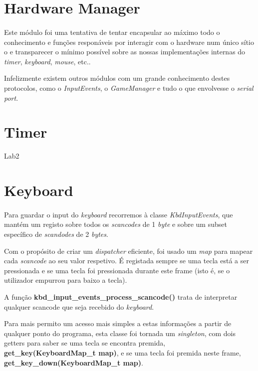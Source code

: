 \documentclass{report}
\begin{document}
\section{Hardware Manager}

\paragraph{}
Este módulo foi uma tentativa de tentar encapsular ao máximo todo o conhecimento e funções responáveis por interagir com o hardware num único sítio o e transparecer o mínimo possível sobre as nossas implementações internas do \textit{timer}, \textit{keyboard}, \textit{mouse}, etc..

Infelizmente existem outros módulos com um grande conhecimento destes protocolos, como o \textit{InputEvents}, o \textit{GameManager} e tudo o que envolvesse o \textit{serial port}.

\section{Timer}

Lab2

\section{Keyboard}

\paragraph{}
Para guardar o input do \textit{keyboard} recorremos à classe \textit{KbdInputEvents}, que mantém um registo sobre todos os \textit{scancodes} de 1 \textit{byte} e sobre um subset específico de \textit{scandodes} de 2 \textit{bytes}.

Com o propósito de criar um \textit{dispatcher} eficiente, foi usado um \textit{map} para mapear cada \textit{scancode} ao seu valor respetivo. É registada sempre se uma tecla está a ser pressionada e se uma tecla foi pressionada durante este frame (isto é, se o utilizador empurrou para baixo a tecla).

A função \textbf{kbd\_input\_events\_process\_scancode()} trata de interpretar qualquer scancode que seja recebido do \textit{keyboard}.

Para mais permito um acesso mais simples a estas informações a partir de qualquer ponto do programa, esta classe foi tornada um \textit{singleton}, com dois getters para saber se uma tecla se encontra premida, \textbf{get\_key(KeyboardMap\_t map)}, e se uma tecla foi premida neste frame, \textbf{get\_key\_down(KeyboardMap\_t map)}.
\end{document}
